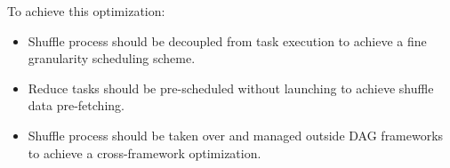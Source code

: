 To achieve this optimization:
\begin{itemize}
	\item Shuffle process should be decoupled from task execution to achieve a fine granularity scheduling scheme.
	\item Reduce tasks should be pre-scheduled without launching to achieve shuffle data pre-fetching.
	\item Shuffle process should be taken over and managed outside DAG frameworks to achieve a cross-framework optimization.
\end{itemize}
